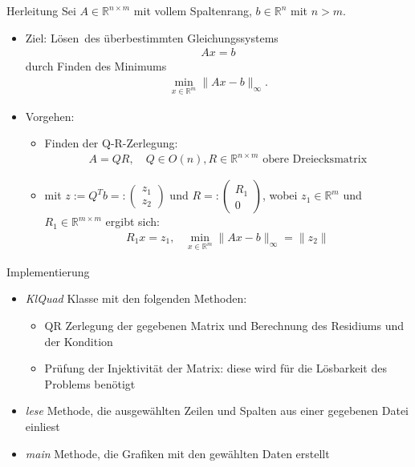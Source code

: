 \documentclass{beamer}
\begin{document}
\begin{frame}{Herleitung}
  Sei $A\in \mathbb{R}^{n\times m}$ mit vollem Spaltenrang,  $b\in \mathbb{R}^n$ mit $n>m$.\\
  \begin{itemize}
  \item Ziel: \glqq Lösen\grqq ~des überbestimmten Gleichungssystems 
  \begin{align}
  Ax=b
  \end{align}
  durch Finden des Minimums
  \begin{align}
  \min\limits_{x\in\mathbb{R}^m}\|Ax-b\|_\infty.
  \end{align}\pause
\item Vorgehen:
\begin{itemize}
\item Finden der Q-R-Zerlegung:
\begin{align}
A=QR, \text{~~~}Q\in  O(n), R\in \mathbb{R}^{n\times m}\text{ obere Dreiecksmatrix}
\end{align}
\item mit $z:=Q^Tb=:
\begin{pmatrix}
z_1\\
\hline
z_2
\end{pmatrix}$ und $R=:\begin{pmatrix}
R_1\\
0
\end{pmatrix}$, wobei $z_1\in\mathbb{R}^{m}$ und $R_1\in\mathbb{R}^{m\times m}$ ergibt sich:
\begin{align}
R_1x=z_1\text{,~~~}  \min\limits_{x\in\mathbb{R}^m}\|Ax-b\|_\infty=\|z_2\|
\end{align}

\end{itemize}
  \end{itemize}
  
\end{frame}

 \begin{frame}{Implementierung}
 	\begin{itemize}
  	\item \textit{KlQuad} Klasse mit den folgenden Methoden:
  	\begin{itemize}
  		\item QR Zerlegung der gegebenen Matrix und Berechnung des Residiums und der Kondition
  		\item Prüfung der Injektivität der Matrix: diese wird für die Lösbarkeit des Problems benötigt  		
  	\end{itemize}
  	\pause
  	\item \textit{lese} Methode, die ausgewählten Zeilen und Spalten aus einer gegebenen Datei einliest
  	\pause
  	\item \textit{main} Methode, die Grafiken mit den gewählten Daten erstellt
  	\end{itemize}
 \end{frame}
\end{document}
